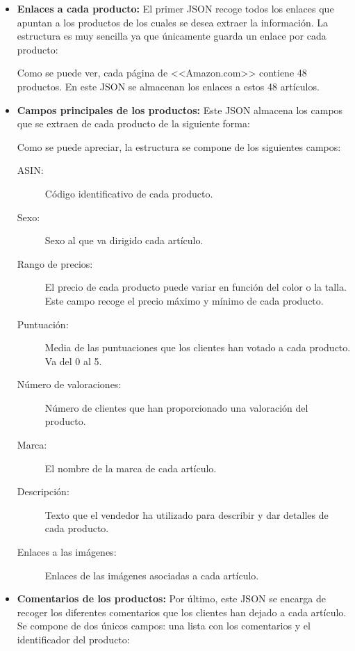 \begin{itemize}
    \item \textbf{Enlaces a cada producto:} El primer JSON recoge todos los enlaces que apuntan a los productos de los cuales se desea extraer la información. La estructura es muy sencilla ya que únicamente guarda un enlace por cada producto:
    
    
    Como se puede ver, cada página de <<Amazon.com>> contiene 48 productos. En este JSON se almacenan los enlaces a estos 48 artículos.
    
    \item \textbf{Campos principales de los productos:} Este JSON almacena los campos que se extraen de cada producto de la siguiente forma:
    
    
    Como se puede apreciar, la estructura se compone de los siguientes campos:
    
    \begin{description}
        \item[ASIN:] Código identificativo de cada producto.
        \item[Sexo:] Sexo al que va dirigido cada artículo.
        \item[Rango de precios:] El precio de cada producto puede variar en función del color o la talla. Este campo recoge el precio máximo y mínimo de cada producto.
        \item[Puntuación:] Media de las puntuaciones que los clientes han votado a cada producto. Va del 0 al 5.
        \item[Número de valoraciones:] Número de clientes que han proporcionado una valoración del producto.
        \item[Marca:] El nombre de la marca de cada artículo.
        \item[Descripción:] Texto que el vendedor ha utilizado para describir y dar detalles de cada producto.
        \item[Enlaces a las imágenes:] Enlaces de las imágenes asociadas a cada artículo.
    \end{description}
    
    \item \textbf{Comentarios de los productos:} Por último, este JSON se encarga de recoger los diferentes comentarios que los clientes han dejado a cada artículo. Se compone de dos únicos campos: una lista con los comentarios y el identificador del producto:
    
\end{itemize}

